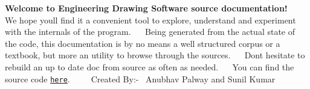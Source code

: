 {\bfseries Welcome to Engineering Drawing Software source documentation!}~\newline
~\newline
We hope you\textquotesingle{}ll find it a convenient tool to explore, understand and experiment with the internals of the program.~\newline
~\newline
Being generated from the actual state of the code, this documentation is by no means a well structured corpus or a textbook, but more an utility to browse through the sources.~\newline
~\newline
Don\textquotesingle{}t hesitate to rebuild an up to date doc from source as often as needed.~\newline
~\newline
You can find the source code \href{https://github.com/sunil-sopho/Cop290}{\tt here}.~\newline
~\newline
~\newline
Created By\+:-\/~\newline
Anubhav Palway and Sunil Kumar 